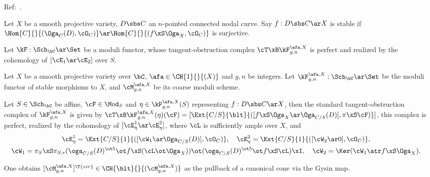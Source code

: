 \documentclass[article, a4paper, twoside]{universal}
\begin{document}
\confighead{}{}{}


Ref:~\cite{LT1998}.

\begin{cmt}[0]
    \begin{dfn}
        Let $X$ be a smooth projective variety, $D\sbs C$ an $n$-pointed connected nodal curve. Say $f:D\sbs C\ar X$ is stable if $\Hom{C}{}{(\Oga_{C}(D),\cO_{C})}\ar\Hom{C}{}{(f\xS\Oga_{X},\cO_{C})}$ is surjective.
    \end{dfn}
\end{cmt}

\begin{cmt}[0]
    Let $\kF:\Sch_{\bC}\ar\Set$ be a moduli functor, whose tangent-obstruction complex $\cT\xB\kF_{g,n}^{\afa,X}$ is perfect and realized by the cohomology of $[\cE_{1}\ar\cE_{2}]$ over $S$.

\end{cmt}

\begin{stp}
    Let $X$ be a smooth projective variety over $\bC$, $\afa\in\CH{1}{}{(X)}$ and $g,n$ be integers. Let $\kF_{g,n}^{\afa,X}:\Sch_{\bC}\ar\Set$ be the moduli functor of stable morphisms to $X$, and $\cM_{g,n}^{\afa,X}$ be its coarse moduli scheme.

    Let $S\in\Sch_{\bC}$ be affine, $\cF\in\Mod_{S}$ and $\eta\in\kF_{g,n}^{\afa,X}(S)$ representing $f:D\sbs C\ar X$, then the standard tangent-obstruction complex of $\kF_{g,n}^{\afa,X}$ is given by $\cT\xB\kF_{g,n}^{\afa,X}(\eta)(\cF)=[\Ext{C/S}{\blt}{([f\xS\Oga_{X}\ar\Oga_{C/S}(D)],\pi\xS\cF)}]$, this complex is perfect, realized by the cohomology of $[\cE_{\eta}^{1}\ar\cE_{\eta}^{2}]$, where $\cL$ is sufficiently ample over $X$, and
    \begin{gather*}
      \cE_{\eta}^{1}=\Ext{C/S}{1}{([\cW_{1}\ar\Oga_{C/S}(D)],\cO_{C})},\quad \cE_{\eta}^{2}=\Ext{C/S}{1}{([\cW_{2}\ar0],\cO_{C})}, \\
      \cW_{1}=\pi_{S}\xS\pi_{S,*}(\oga_{C/S}(D)^{\ot5}\ot f\xS(\cL\ot\Oga_{X}))\ot(\oga_{C/S}(D)^{\ot5}\ot f\xS\cL)\xI,\quad \cW_{2}=\Ker(\cW_{1}\atr f\xS\Oga_{X}).
    \end{gather*}

    One obtains $[\cM_{g,n}^{\afa,X}]^{\T{vir}}\in\CH{\blt}{}{(\cM_{g,n}^{\afa,X})}$ as the pullback of a canonical cone via the Gysin map.
\end{stp}
\end{document}
